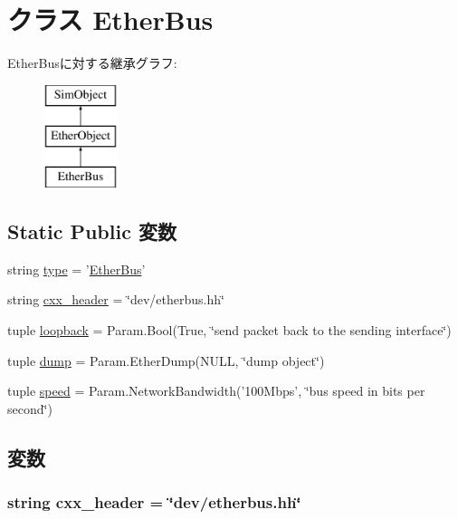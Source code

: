\hypertarget{classEthernet_1_1EtherBus}{
\section{クラス EtherBus}
\label{classEthernet_1_1EtherBus}
}
EtherBusに対する継承グラフ:\begin{figure}[H]
\begin{center}
\leavevmode
\includegraphics[height=3cm]{classEthernet_1_1EtherBus}
\end{center}
\end{figure}
\subsection*{Static Public 変数}
\begin{DoxyCompactItemize}
\item 
string \hyperlink{classEthernet_1_1EtherBus_acce15679d830831b0bbe8ebc2a60b2ca}{type} = '\hyperlink{classEthernet_1_1EtherBus}{EtherBus}'
\item 
string \hyperlink{classEthernet_1_1EtherBus_a17da7064bc5c518791f0c891eff05fda}{cxx\_\-header} = \char`\"{}dev/etherbus.hh\char`\"{}
\item 
tuple \hyperlink{classEthernet_1_1EtherBus_aef61658bdfb1270125b24a27b1b38492}{loopback} = Param.Bool(True, \char`\"{}send packet back to the sending interface\char`\"{})
\item 
tuple \hyperlink{classEthernet_1_1EtherBus_aef8d0e67d5fcd75abc7d08ee1952b0de}{dump} = Param.EtherDump(NULL, \char`\"{}dump object\char`\"{})
\item 
tuple \hyperlink{classEthernet_1_1EtherBus_a33da1950995c2bf1208262efeb4de233}{speed} = Param.NetworkBandwidth('100Mbps', \char`\"{}bus speed in bits per second\char`\"{})
\end{DoxyCompactItemize}


\subsection{変数}
\hypertarget{classEthernet_1_1EtherBus_a17da7064bc5c518791f0c891eff05fda}{
\subsubsection[{cxx\_\-header}]{\setlength{\rightskip}{0pt plus 5cm}string {\bf cxx\_\-header} = \char`\"{}dev/etherbus.hh\char`\"{}}}
\label{classEthernet_1_1EtherBus_a17da7064bc5c518791f0c891eff05fda}



